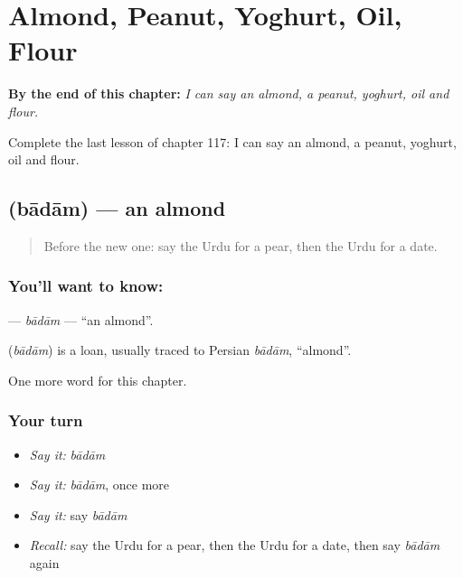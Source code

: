 
\chapter{Almond, Peanut, Yoghurt, Oil, Flour}
\label{ch:ur-almond-peanut-yoghurt-oil-flour}

\begin{chapteropening}
\textbf{By the end of this chapter:} \emph{I can say an almond, a peanut, yoghurt, oil and flour.}

Complete the last lesson of chapter 117: I can say an almond, a peanut, yoghurt, oil and flour.
\end{chapteropening}

\section[\texorpdfstring{\ur{بادام} (bādām)}{بادام (bādām)}]{ (bādām) — an almond}

\label{lesson:UR-C117-badam}



\begin{quote}
Before the new one: say the Urdu for a pear, then the Urdu for a date.
\end{quote}

\subsection*{You'll want to know: }
\textbf{} — \emph{bādām} — \textquotedblleft{}an almond\textquotedblright{}.

\begin{cousinweb}
\textbf{} (\emph{bādām}) is a loan, usually traced to Persian \emph{bādām}, \textquotedblleft{}almond\textquotedblright{}.
\end{cousinweb}

\begin{grammarlens}[title={What you've built}]
One more word for this chapter.
\end{grammarlens}

\subsection*{Your turn}
\begin{itemize}
\raggedright
  \item \emph{Say it:} \emph{bādām}
  \item \emph{Say it:} \emph{bādām}, once more
  \item \emph{Say it:} say \emph{bādām}
  \item \emph{Recall:} say the Urdu for a pear, then the Urdu for a date, then say \emph{bādām} again
\end{itemize}

